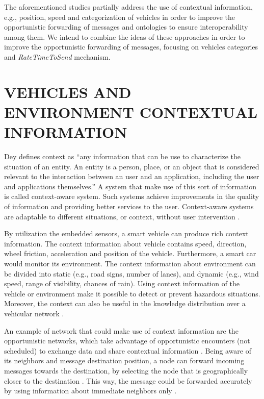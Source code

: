 \documentclass[letterpaper, 10 pt, conference]{ieeeconf}  %
\begin{document}
The aforementioned studies partially address the use of contextual information, e.g., position, speed and categorization of vehicles in order to improve the opportunistic forwarding of messages and ontologies to ensure interoperability among them. We intend to combine the ideas of these approaches in order to improve the opportunistic forwarding of messages, focusing on vehicles categories and \emph{RateTimeToSend} mechanism.

\section{VEHICLES AND ENVIRONMENT CONTEXTUAL INFORMATION}

Dey \cite{dey2001} defines context as “any information that can be use to characterize the situation of an entity. An entity is a person, place, or an object that is considered relevant to the interaction between an user and an application, including the user and applications themselves.” A system that make use of this sort of information is called context-aware system. Such systems achieve improvements in the quality of information and providing better services to the user. Context-aware systems are adaptable to  different situations, or context, without user intervention \cite{baldauf2007}.

By utilization the embedded sensors, a smart vehicle can produce rich context information. The context information about vehicle contains speed, direction, wheel friction, acceleration and position of the vehicle. Furthermore, a smart car would monitor its environment. The context information about environment can be divided into static (e.g., road signs, number of lanes), and dynamic (e.g., wind speed, range of visibility, chances of rain). Using context information of the vehicle or environment make it possible to detect or prevent hazardous situations. Moreover, the context can also be useful in the knowledge distribution over a vehicular network \cite{tocadas2010}.

An example of network that could make use of context information are the opportunistic networks, which take advantage of opportunistic encounters (not scheduled) to exchange data and share contextual information  \cite{geoopp2014}. Being aware of its neighbors and message destination position, a node can forward incoming messages towards the destination, by selecting the node that is geographically closer to the destination \cite{gpsr2000}. This way, the message could be forwarded accurately by using information about immediate neighbors only \cite{magf2009}.
\end{document}
